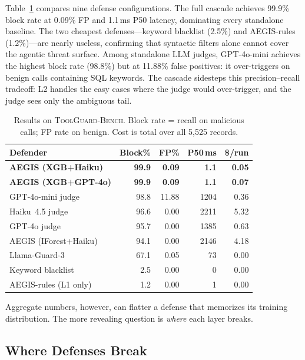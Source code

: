 \documentclass[sigconf]{acmart}
\newcommand{\bench}{\textsc{ToolGuard-Bench}\xspace}
\begin{document}
Table~\ref{tab:overall} compares nine defense configurations.
The full cascade achieves 99.9\% block rate at 0.09\% FP and 1.1\,ms P50 latency, dominating every standalone baseline.
The two cheapest defenses---keyword blacklist (2.5\%) and AEGIS-rules (1.2\%)---are nearly useless, confirming that syntactic filters alone cannot cover the agentic threat surface.
Among standalone LLM judges, GPT-4o-mini achieves the highest block rate (98.8\%) but at 11.88\% false positives: it over-triggers on benign calls containing SQL keywords.
The cascade sidesteps this precision--recall tradeoff: L2 handles the easy cases where the judge would over-trigger, and the judge sees only the ambiguous tail.

\begin{table}[t]
\centering\small
\caption{Results on \bench. Block rate = recall on malicious calls; FP rate on benign. Cost is total over all 5{,}525 records.}
\vspace{-0.1in}
\label{tab:overall}
\begin{tabular}{lrrrr}
\toprule
Defender & Block\% & FP\% & P50\,ms & \$/run \\
\midrule
\rowcolor{green!8}
\textbf{AEGIS (XGB+Haiku)} & \textbf{99.9} & \textbf{0.09} & \textbf{1.1} & \textbf{0.05} \\
\rowcolor{green!8}
\textbf{AEGIS (XGB+GPT-4o)} & \textbf{99.9} & \textbf{0.09} & \textbf{1.1} & \textbf{0.07} \\
GPT-4o-mini judge & 98.8 & 11.88 & 1204 & 0.36 \\
Haiku~4.5 judge & 96.6 & 0.00 & 2211 & 5.32 \\
GPT-4o judge & 95.7 & 0.00 & 1385 & 0.63 \\
AEGIS (IForest+Haiku) & 94.1 & 0.00 & 2146 & 4.18 \\
Llama-Guard-3 & 67.1 & 0.05 & 73 & 0.00 \\
Keyword blacklist & 2.5 & 0.00 & 0 & 0.00 \\
AEGIS-rules (L1 only) & 1.2 & 0.00 & 1 & 0.00 \\
\bottomrule
\end{tabular}
\vspace{-0.1in}
\end{table}

Aggregate numbers, however, can flatter a defense that memorizes its training distribution.
The more revealing question is \emph{where} each layer breaks.

\subsection{Where Defenses Break}
\end{document}
